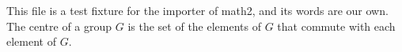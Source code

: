 \documentclass[12pt]{article}
\begin{document}
This file is a test fixture for the importer of math2, and its words are our own. The centre of a group $G$ is the set of the elements of $G$ that commute with each element of $G$.
\end{document}
